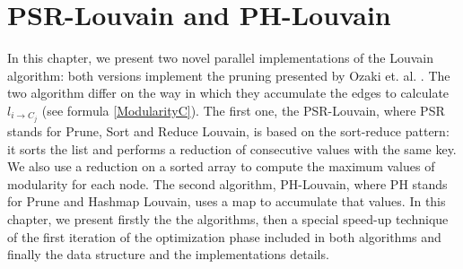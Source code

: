 \section{PSR-Louvain and PH-Louvain}\label{GPUalg}
In this chapter, we present two novel parallel implementations of the Louvain algorithm: both versions implement the pruning presented by Ozaki et. al. \cite{pruning}.  The two algorithm differ on the way in which they accumulate the edges to calculate $l_{i\rightarrow C_j}$  (see formula \ref{ModularityC}). The first one, the PSR-Louvain, where PSR stands for Prune, Sort and Reduce Louvain, is based on the sort-reduce pattern: it sorts the list and performs a reduction of consecutive values with the same key. We also use a reduction on a sorted array to compute the maximum values of modularity for each node. 
The second algorithm, PH-Louvain, where PH stands for Prune and Hashmap Louvain, uses a map to accumulate that values.
In this chapter, we present firstly the the algorithms, then a special speed-up technique of the first iteration of the optimization phase included in both algorithms and finally the data structure and the implementations details.

